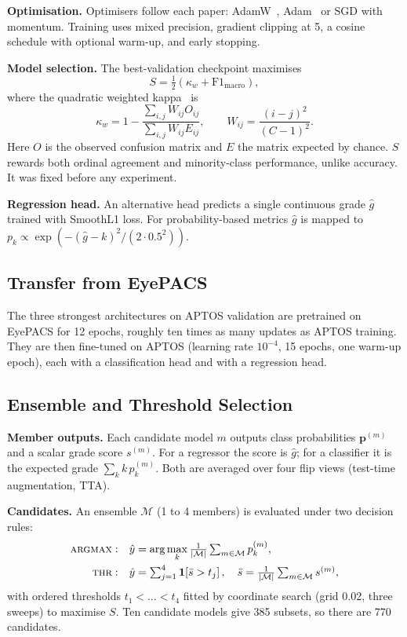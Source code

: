 \documentclass[journal]{IEEEtran}
\begin{document}
\textbf{Optimisation.} Optimisers follow each paper: AdamW~\cite{loshchilov2019adamw},
Adam~\cite{kingma2015adam} or SGD with momentum. Training uses mixed precision, gradient clipping at
5, a cosine schedule with optional warm-up, and early stopping.

\textbf{Model selection.} The best-validation checkpoint maximises
\begin{equation}
S = \tfrac{1}{2}\left(\kappa_w + \mathrm{F1}_{\mathrm{macro}}\right),
\label{eq:score}
\end{equation}
where the quadratic weighted kappa~\cite{cohen1968kappa} is
\begin{equation}
\kappa_w = 1-\frac{\sum_{i,j} W_{ij}O_{ij}}{\sum_{i,j}W_{ij}E_{ij}},\qquad W_{ij}=\frac{(i-j)^2}{(C-1)^2}.
\end{equation}
Here $O$ is the observed confusion matrix and $E$ the matrix expected by chance. $S$ rewards both
ordinal agreement and minority-class performance, unlike accuracy. It was fixed before any experiment.

\textbf{Regression head.} An alternative head predicts a single continuous grade $\hat{g}$ trained
with SmoothL1 loss. For probability-based metrics $\hat{g}$ is mapped to
$p_k\propto\exp(-(\hat{g}-k)^2/(2\cdot0.5^2))$.

\subsection{Transfer from EyePACS}
The three strongest architectures on APTOS validation are pretrained on EyePACS for 12 epochs,
roughly ten times as many updates as APTOS training. They are then fine-tuned on APTOS (learning rate
$10^{-4}$, 15 epochs, one warm-up epoch), each with a classification head and with a regression head.

\subsection{Ensemble and Threshold Selection}
\label{sec:selection}
\textbf{Member outputs.} Each candidate model $m$ outputs class probabilities $\mathbf{p}^{(m)}$ and
a scalar grade score $s^{(m)}$. For a regressor the score is $\hat{g}$; for a classifier it is the
expected grade $\sum_k k\,p^{(m)}_k$. Both are averaged over four flip views (test-time augmentation,
TTA).

\textbf{Candidates.} An ensemble $\mathcal{M}$ (1 to 4 members) is evaluated under two decision
rules:
\begin{align}
\textsc{argmax}:&\quad \hat{y}=\arg\max_k \tfrac{1}{|\mathcal{M}|}\textstyle\sum_{m\in\mathcal{M}}p^{(m)}_k,\\
\textsc{thr}:&\quad \hat{y}=\textstyle\sum_{j=1}^{4}\mathbf{1}\!\left[\bar{s}>t_j\right],\quad
\bar{s}=\tfrac{1}{|\mathcal{M}|}\sum_{m\in\mathcal{M}}s^{(m)},
\end{align}
with ordered thresholds $t_1<\dots<t_4$ fitted by coordinate search (grid 0.02, three sweeps) to
maximise $S$. Ten candidate models give 385 subsets, so there are 770 candidates.
\end{document}
